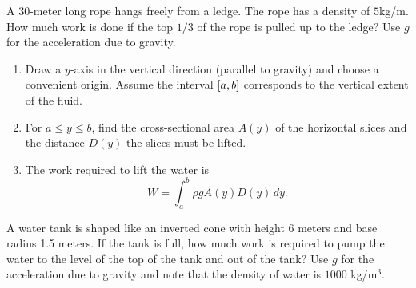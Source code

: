 \documentclass[../mathNotesPreamble]{subfiles}
\begin{document}
  \begin{ex*}
    A $30$-meter long rope hangs freely from a ledge. The rope has a density of $5$\nobreakspace kg/m.  How much work is done if the top $1/3$ of the rope is pulled up to the ledge? Use $g$ for the acceleration due to gravity.
  \end{ex*}
  \pagebreak

  \begin{thmBox*}
    \begin{enumerate}
      \item 
        Draw a $y$-axis in the vertical direction (parallel to gravity) and choose a convenient origin. Assume the interval ${\left[a,b\right]}$ corresponds to the vertical extent of the fluid.
      \item 
        For $a\leq y\leq b$, find the cross-sectional area $A(y)$ of the horizontal slices and the distance $D(y)$ the slices must be lifted.
      \item 
        The work required to lift the water is
          \[W=\int_a^b \rho gA(y)D(y)\,dy.\]
    \end{enumerate}
  \end{thmBox*}

  \begin{ex*}
    A water tank is shaped like an inverted cone with height 6 meters and base radius 1.5 meters. If the tank is full, how much work is required to pump the water to the level of the top of the tank and out of the tank? Use $g$ for the acceleration due to gravity and note that the density of water is $1000$ kg/m$^3$. 
  \end{ex*}
  \begin{flushright}
    \def\xx{2.75}
    \def\xxx{\xx+2.15}
  \end{flushright}
  \pagebreak
\end{document}
